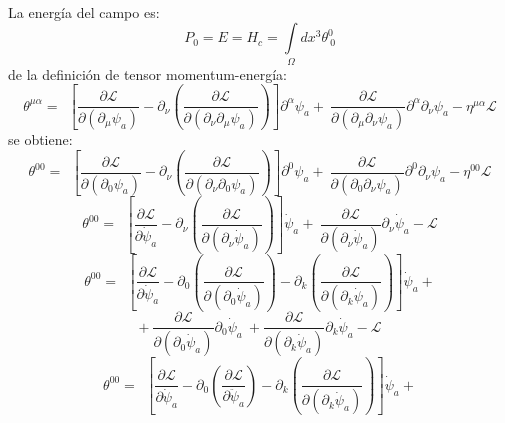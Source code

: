 \documentclass[a4paper,12pt]{article}
\begin{document}
\\

La energía del campo es:
\begin{equation}
P_0=E=H_c=\int\limits_{\Omega}dx^{3}\theta^{0}_{\ 0} 
\end{equation}
de la definición de tensor momentum-energía:
\begin{equation}
\theta^{\mu\alpha}= \ \ \left[\frac{\partial \mathscr{L} }{\partial(\partial_{\mu} \psi_a)}-\partial_{\nu}\left(\frac{\partial\mathscr{L} }{\partial(\partial_{\nu}\partial_{\mu} \psi_a)}  \right) \right]\partial^\alpha\psi_a +\ \frac{\partial\mathscr{L} }{\partial(\partial_{\mu}\partial_{\nu} \psi_a)}\partial^\alpha\partial_\nu\psi_a-\eta^{\mu\alpha}\mathscr{L} 
\end{equation}
se obtiene:
\begin{equation}
\theta^{00}= \ \ \left[\frac{\partial \mathscr{L} }{\partial(\partial_{0} \psi_a)}-\partial_{\nu}\left(\frac{\partial\mathscr{L} }{\partial(\partial_{\nu}\partial_{0} \psi_a)}  \right) \right]\partial^0\psi_a +\ \frac{\partial\mathscr{L} }{\partial(\partial_{0}\partial_{\nu} \psi_a)}\partial^0\partial_\nu\psi_a-\eta^{00}\mathscr{L}
\end{equation}
\begin{equation}
\theta^{00}= \ \ \left[\frac{\partial \mathscr{L} }{\partial\dot \psi_a}-\partial_{\nu}\left(\frac{\partial\mathscr{L} }{\partial(\partial_{\nu}\dot \psi_a)}  \right) \right]\dot\psi_a +\ \frac{\partial\mathscr{L} }{\partial(\partial_{\nu}\dot \psi_a)}\partial_\nu\dot\psi_a-\mathscr{L} 
\end{equation}
\begin{equation}
\theta^{00}= \ \ \left[\frac{\partial \mathscr{L} }{\partial\dot \psi_a}-\partial_{0}\left(\frac{\partial\mathscr{L} }{\partial(\partial_{0}\dot \psi_a)}  \right)-\partial_{k}\left(\frac{\partial\mathscr{L} }{\partial(\partial_{k}\dot \psi_a)}  \right) \right]\dot\psi_a+ 
\end{equation}
$$+\ \frac{\partial\mathscr{L} }{\partial(\partial_{0}\dot \psi_a)}\partial_0\dot\psi_a\ + \frac{\partial\mathscr{L} }{\partial(\partial_{k}\dot \psi_a)}\partial_k\dot\psi_a-\mathscr{L} $$
\begin{equation}
\theta^{00}= \ \ \left[\frac{\partial \mathscr{L} }{\partial\dot \psi_a}-\partial_{0}\left(\frac{\partial\mathscr{L} }{\partial\ddot \psi_a}  \right)-\partial_{k}\left(\frac{\partial\mathscr{L} }{\partial(\partial_{k}\dot \psi_a)}  \right) \right]\dot\psi_a+ 
\end{equation}
\end{document}
